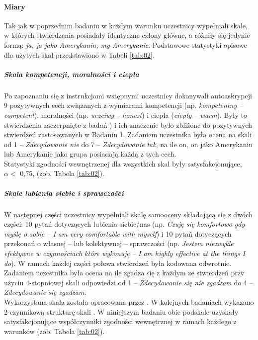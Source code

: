 \documentclass[man]{apa6}
\begin{document}
\paragraph{Miary}
Tak jak w poprzednim badaniu w każdym warunku uczestnicy wypełniali skale, w których stwierdzenia posiadały identyczne człony główne, a różniły się jedynie formą: \emph{ja, ja jako Amerykanin, my Amerykanie}. Podstawowe statystyki opisowe dla użytych skal przedstawiono w Tabeli \ref{tab:02}.

\subparagraph{Skala kompetencji, moralności i ciepła}
Po zapoznaniu się z instrukcjami wstępnymi uczestnicy dokonywali autoaskrypcji 9 pozytywnych cech związanych z wymiarami kompetencji (np. \emph{kompetentny -- competent}), moralności (np. \emph{uczciwy -- honest}) i ciepła (\emph{ciepły -- warm}). Były to stwierdzenia zaczerpnięte z badań \textcite{leach2007group}) i ich znaczenie było zbliżone do pozytywnych stwierdzeń zastosowanych w Badaniu 1. Zadaniem uczestnika była ocena na skali od 1 -- \emph{Zdecydowanie nie} do 7 -- \emph{Zdecydowanie tak}, na ile on, on jako Amerykanin lub Amerykanie jako grupa posiadają każdą z tych cech. \\
Statystyki zgodności wewnętrzenej dla wszystkich skal były satysfakcjonujące, $\alpha <$ 0,75, (zob. Tabela \ref{tab:02}). \\
\subparagraph{Skale lubienia siebie i sprawczości}
W następnej części uczestnicy wypełniali skalę samooceny składającą się z dwóch części: 10 pytań dotyczących lubienia siebie/nas (np. \emph{Czuję się komfortowo gdy myślę o sobie -- I am very comfortable with myself}) i 10 pytań dotyczących przekonań o własnej -- lub kolektywnej -- sprawczości (np. \emph{Jestem niezwykle efektywne w czynnościach które wykonuję -- I am highly effective at the things I do}). W ramach każdej części połowa stwierdzeń była kodowana odwrotnie. Zadaniem uczestnika była ocena na ile zgadza się z każdym ze stwierdzeń przy użyciu 4-stopniowej skali odpowiedzi od 1 -- \emph{Zdecydowanie się nie zgadzam} do 4 -- \emph{Zdecydowanie się zgadzam}.\\
Wykorzystana skala została opracowana przez \textcite{tafarodi1995self}. W kolejnych badaniach wykazano 2-czynnikową strukturę skali \parencite{tafarodi2002decomposing}. W niniejszym badaniu obie podskale uzyskały satysfakcjonujące współczynniki zgodności wewnętrznej w ramach każdego z warunków (zob. Tabela \ref{tab:02}).
\end{document}
